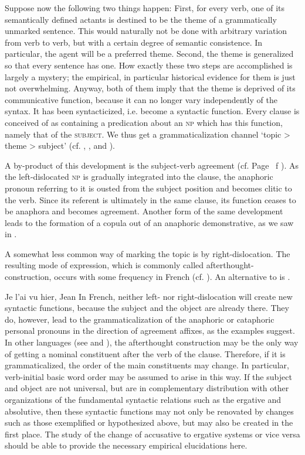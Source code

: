 Suppose now the following two things happen: First, for every verb, one of its semantically defined actants is destined to be the theme of a grammatically unmarked sentence. This would naturally not be done with arbitrary variation from verb to verb, but with a certain degree of semantic consistence. In particular, the agent will be a preferred theme. Second, the theme is generalized so that every sentence has one. How exactly these two steps are accomplished is largely a mystery; the empirical, in particular historical evidence for them is just not overwhelming. Anyway, both of them imply that the theme is deprived of its communicative function, because it can no longer vary independently of the syntax. It has been syntacticized, i.e. become a syntactic function. Every clause is conceived of as containing a predication about an \textsc{np} which has this function, namely that of the \textsc{subject}. We thus get a grammaticalization channel ‘topic {\textgreater} theme {\textgreater} subject’ (cf. \citealt[484]{LiEtAl1976}, \citealt[83--85]{Givón1979}, \citealt[114]{Comrie1981b} and \citealt[99--101]{MallinsonEtAl1981}).

A by-product of this development is the subject-verb agreement (cf. Page~\pageref{page44}\chk%
f  ). As the left-dislocated \textsc{np} is gradually integrated into the clause, the anaphoric pronoun referring to it is ousted from the subject position and becomes clitic to the verb. Since its referent is ultimately in the same clause, its function ceases to be anaphora and becomes agreement. Another form of the same development leads to the formation of a copula out of an anaphoric demonstrative, as we saw in .

A somewhat less common way of marking the topic is by right-dislocation. The resulting mode of expression, which is commonly called afterthought-construction, occurs with some frequency in French (cf. \citealt[402, 427]{MallinsonEtAl1981}). An alternative to  is .

\ea \label{ex:E94}
  Je l'ai vu hier, Jean
  \z
\noindent In French, neither left- nor right-dislocation will create new syntactic functions, because the subject and the object are already there. They do, however, lead to the grammaticalization of the anaphoric or cataphoric personal pronouns in the direction of agreement affixes, as the examples suggest. In other languages (see \citealt[119--121]{Hyman1975} and \citealt[170]{Vincent1980a}), the afterthought construction may be the only way of getting a nominal constituent after the verb of the clause. Therefore, if it is grammaticalized, the order of the main constituents may change. In particular, verb-initial basic word order may be assumed to arise in this way. If the subject and object are not universal, but are in complementary distribution with other organizations of the fundamental syntactic relations such as the ergative and absolutive, then these syntactic functions may not only be renovated by changes such as those exemplified or hypothesized above, but may also be created in the first place. The study of the change of accusative to ergative systems or vice versa should be able to provide the necessary empirical elucidations here.

